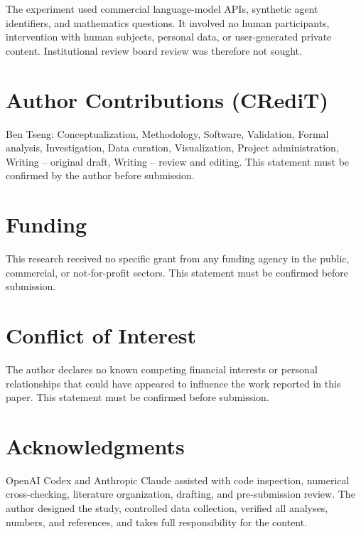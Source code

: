 \documentclass[11pt]{article}
\begin{document}
The experiment used commercial language-model APIs, synthetic agent identifiers, and mathematics questions. It involved no human participants, intervention with human subjects, personal data, or user-generated private content. Institutional review board review was therefore not sought.

\section{Author Contributions (CRediT)}

Ben Tseng: Conceptualization, Methodology, Software, Validation, Formal analysis, Investigation, Data curation, Visualization, Project administration, Writing – original draft, Writing – review and editing. This statement must be confirmed by the author before submission.

\section{Funding}

This research received no specific grant from any funding agency in the public, commercial, or not-for-profit sectors. This statement must be confirmed before submission.

\section{Conflict of Interest}

The author declares no known competing financial interests or personal relationships that could have appeared to influence the work reported in this paper. This statement must be confirmed before submission.

\section{Acknowledgments}

OpenAI Codex and Anthropic Claude assisted with code inspection, numerical cross-checking, literature organization, drafting, and pre-submission review. The author designed the study, controlled data collection, verified all analyses, numbers, and references, and takes full responsibility for the content.

\begingroup
\small


\endgroup
\end{document}
